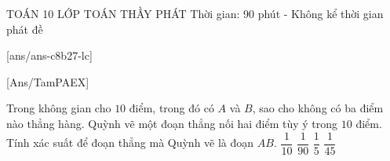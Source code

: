 
\begin{name}
	{\tenchude}
	{TOÁN 10}
	{LỚP TOÁN THẦY PHÁT}
	{Thời gian: 90 phút - Không kể thời gian phát đề}
\end{name}
 
\setcounter{ex}{0}
[ans/ans-c8b27-lc]
%	
%		


[Ans/TamPAEX]
\begin{ex}%
	Trong không gian cho $10$ điểm, trong đó có $A$ và $B$, sao cho không có ba điểm nào thẳng hàng. Quỳnh vẽ một đoạn thẳng nối hai điểm tùy ý trong $10$ điểm. Tính xác suất để đoạn thẳng mà Quỳnh vẽ là đoạn $AB$.
	\choice
	{$\dfrac{1}{10}$}
	{$\dfrac{1}{90}$}
	{$\dfrac{1}{5}$}
	{\True $\dfrac{1}{45}$}
\end{ex}

